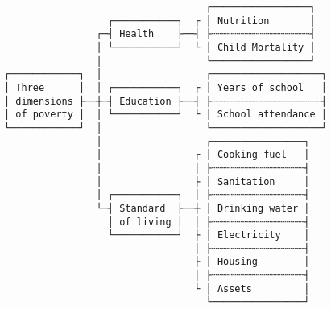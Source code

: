 \documentclass[varwidth,crop]{standalone}
\begin{document}
\begin{verbatim}
                                   ┌─────────────────┐
                  ┌───────────┐  ┌ │ Nutrition       │
                ┌─┤ Health    ├──┤ ├┄┄┄┄┄┄┄┄┄┄┄┄┄┄┄┄┄┤
                │ └───────────┘  └ │ Child Mortality │
                │                  └─────────────────┘
┌────────────┐  │                  ┌───────────────────┐
│ Three      │  │ ┌───────────┐  ┌ │ Years of school   │
│ dimensions ├──┼─┤ Education ├──┤ ├┄┄┄┄┄┄┄┄┄┄┄┄┄┄┄┄┄┄┄┤
│ of poverty │  │ └───────────┘  └ │ School attendance │
└────────────┘  │                  └───────────────────┘
                │                  ┌────────────────┐
                │                ┌ │ Cooking fuel   │
                │                │ ├┄┄┄┄┄┄┄┄┄┄┄┄┄┄┄┄┤
                │                ├ │ Sanitation     │
                │ ┌───────────┐  │ ├┄┄┄┄┄┄┄┄┄┄┄┄┄┄┄┄┤
                └─┤ Standard  ├──┼ │ Drinking water │
                  │ of living │  │ ├┄┄┄┄┄┄┄┄┄┄┄┄┄┄┄┄┤
                  └───────────┘  ├ │ Electricity    │
                                 │ ├┄┄┄┄┄┄┄┄┄┄┄┄┄┄┄┄┤
                                 ├ │ Housing        │ 
                                 │ ├┄┄┄┄┄┄┄┄┄┄┄┄┄┄┄┄┤
                                 └ │ Assets         │
                                   └────────────────┘
\end{verbatim}
\end{document}
